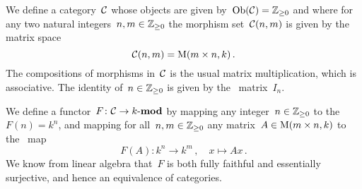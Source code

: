 \section{}

We define a category~$\mathcal{C}$ whose objects are given by~$\operatorname{Ob}(\mathcal{C}) = \mathbb{Z}_{\geq 0}$ and where for any two natural integers~$n, m \in \mathbb{Z}_{\geq 0}$ the morphism set~$\mathcal{C}(n,m)$ is given by the matrix space
\[
    \mathcal{C}(n,m)
  = \operatorname{M}(m \times n, k) \,.
\]
The compositions of morphisms in~$\mathcal{C}$ is the usual matrix multiplication, which is associative.
The identity of~$n \in \mathbb{Z}_{\geq 0}$ is given by the~ matrix~$I_n$.

We define a functor~$F \colon \mathcal{C} \to \text{$k$-$\mathbf{mod}$}$ by mapping any integer~$n \in \mathbb{Z}_{\geq 0}$ to the~{\kvs}~$F(n) = k^n$, and mapping for all~$n, m \in \mathbb{Z}_{\geq 0}$ any matrix~$A \in \operatorname{M}(m \times n, k)$ to the~{\klin} map
\[
          F(A)
  \colon  k^n
  \to     k^m \,,
  \quad   x
  \mapsto Ax \,.
\]
We know from linear algebra that~$F$ is both fully faithful and essentially surjective, and hence an equivalence of categories.




